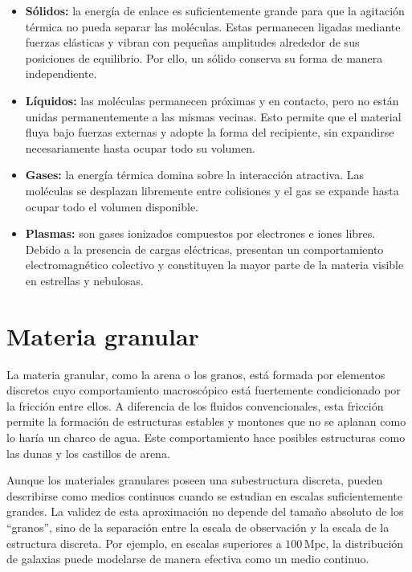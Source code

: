 \begin{itemize}
    \item \textbf{Sólidos:} la energía de enlace es suficientemente grande para
    que la agitación térmica no pueda separar las moléculas. Estas permanecen
    ligadas mediante fuerzas elásticas y vibran con pequeñas amplitudes
    alrededor de sus posiciones de equilibrio. Por ello, un sólido conserva
    su forma de manera independiente.

    \item \textbf{Líquidos:} las moléculas permanecen próximas y en contacto,
    pero no están unidas permanentemente a las mismas vecinas. Esto permite que
    el material fluya bajo fuerzas externas y adopte la forma del recipiente,
    sin expandirse necesariamente hasta ocupar todo su volumen.

    \item \textbf{Gases:} la energía térmica domina sobre la interacción
    atractiva. Las moléculas se desplazan libremente entre colisiones y el gas
    se expande hasta ocupar todo el volumen disponible.

    \item \textbf{Plasmas:} son gases ionizados compuestos por electrones e
    iones libres. Debido a la presencia de cargas eléctricas, presentan un
    comportamiento electromagnético colectivo y constituyen la mayor parte de
    la materia visible en estrellas y nebulosas.
\end{itemize}

\section{Materia granular}

La materia granular, como la arena o los granos, está formada por elementos
discretos cuyo comportamiento macroscópico está fuertemente condicionado por
la fricción entre ellos. A diferencia de los fluidos convencionales, esta
fricción permite la formación de estructuras estables y montones que no se
aplanan como lo haría un charco de agua. Este comportamiento hace posibles
estructuras como las dunas y los castillos de arena.

Aunque los materiales granulares poseen una subestructura discreta, pueden
describirse como medios continuos cuando se estudian en escalas suficientemente
grandes. La validez de esta aproximación no depende del tamaño absoluto de los
``granos'', sino de la separación entre la escala de observación y la escala de
la estructura discreta. Por ejemplo, en escalas superiores a
$100\,\mathrm{Mpc}$, la distribución de galaxias puede modelarse de manera
efectiva como un medio continuo.